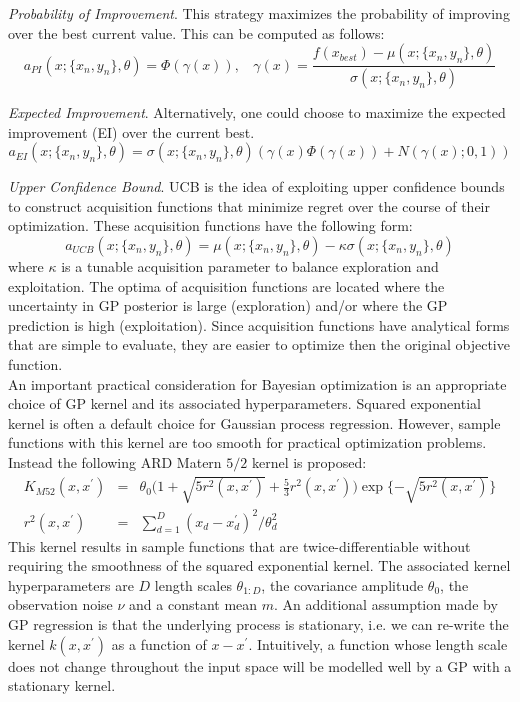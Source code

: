 \textit{Probability of Improvement}. This strategy maximizes the probability of improving over the best current value. This can be computed as follows:
\begin{equation}
    a_{PI}(x;\{x_n,y_n\},\theta) = \Phi(\gamma(x)), ~~~~ \gamma(x) = \frac{f(x_{best}) - \mu(x; \{x_n,y_n\},\theta)}{\sigma(x;\{x_n,y_n\},\theta)}
\end{equation}

\textit{Expected Improvement}. Alternatively, one could choose to maximize the expected improvement (EI) over the current best. 
\begin{equation}
    a_{EI}(x;\{x_n,y_n\},\theta) = \sigma(x;\{x_n,y_n\},\theta)(\gamma(x)\Phi(\gamma(x))+N(\gamma(x);0,1))
\end{equation}

\textit{Upper Confidence Bound}. UCB is the idea of exploiting upper confidence bounds to construct acquisition functions that minimize regret over the course of their optimization. These acquisition functions have the following form:
\begin{equation}
    a_{UCB}(x;\{x_n,y_n\},\theta) = \mu(x;\{x_n,y_n\},\theta) - \kappa \sigma(x;\{x_n,y_n\},\theta)
\end{equation}
where $\kappa$ is a tunable acquisition parameter to balance exploration and exploitation. The optima of acquisition functions are located where the uncertainty in GP posterior is large (exploration) and/or where the GP prediction is high (exploitation). Since acquisition functions have analytical forms that are simple to evaluate, they are easier to optimize then the original objective function.\\

An important practical consideration for Bayesian optimization is an appropriate choice of GP kernel and its associated hyperparameters. Squared exponential kernel is often a default choice for Gaussian process regression. However, sample functions with this kernel are too smooth for practical optimization problems. Instead the following ARD Matern $5/2$ kernel is proposed:
\begin{eqnarray}
    K_{M52}(x,x^{\prime}) &=& \theta_0\bigg(1+\sqrt{5r^2(x,x^{\prime})}+\frac{5}{3}r^2(x,x^{\prime}) \bigg)\exp \{-\sqrt{5r^2(x,x^{\prime})}\}\\
    r^2(x,x^{\prime}) &=& \sum_{d=1}^{D}(x_d - x^{\prime}_d)^{2}/\theta_{d}^{2}
\end{eqnarray}
This kernel results in sample functions that are twice-differentiable without requiring the smoothness of the squared exponential kernel. The associated kernel hyperparameters are $D$ length scales $\theta_{1:D}$, the covariance amplitude $\theta_0$, the observation noise $\nu$ and a constant mean $m$. An additional assumption made by GP regression is that the underlying process is stationary, i.e. we can re-write the kernel $k(x,x^{\prime})$ as a function of $x-x^{\prime}$. Intuitively, a function whose length scale does not change throughout the input space will be modelled well by a GP with a stationary kernel.\\ 

